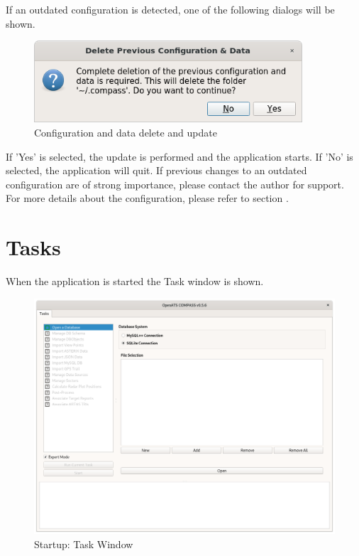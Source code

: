 If an outdated configuration is detected, one of the following dialogs will be shown.

\begin{figure}[H]
    \includegraphics[width=10cm]{../screenshots/config_data_delete_update.png}
  \caption{Configuration and data delete and update}
\end{figure}

If 'Yes' is selected, the update is performed and the application starts. If 'No' is selected, the application will quit. If previous changes to an outdated configuration are of strong importance, please contact the author for support. \\

For more details about the configuration, please refer to section .

\section{Tasks}

When the application is started the Task window is shown. 

\begin{figure}[H]
  \hspace*{-2.5cm}
    \includegraphics[width=19cm]{figures/task_open_database.png}
  \caption{Startup: Task Window}
\end{figure}

